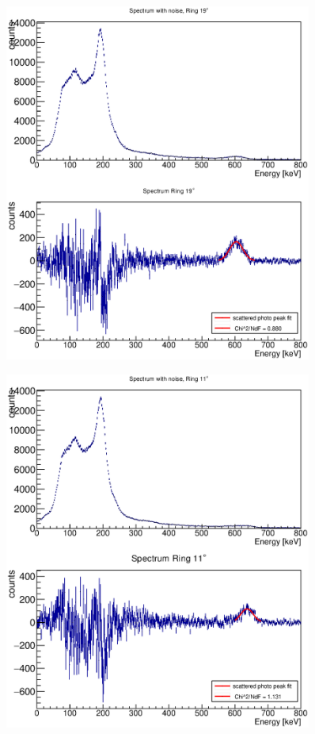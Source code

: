 \documentclass{article}
\begin{document}
\begin{figure}[H]
    \centering
    \includegraphics[width=0.9\textwidth]{Graphen/compton_spektren/18,82grad.eps}
    \caption{}
\end{figure}
\begin{figure}[H]
    \centering
    \includegraphics[width=0.9\textwidth]{Graphen/compton_spektren/11grad.eps}
    \caption{}
\end{figure}
\end{document}
